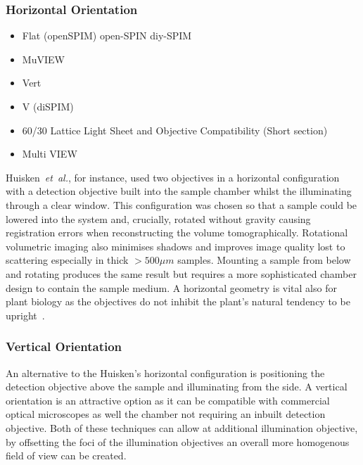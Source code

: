 \subsubsection{Horizontal Orientation}

\begin{itemize}
	\item[\checked]  Flat (openSPIM) open-SPIN diy-SPIM
				\item[\checked] MuVIEW\cite{swoger_multi-view_2007}%
	\item[\checked] Vert
	\item[\checked] V (diSPIM)
	\item[\checked] 60/30		Lattice Light Sheet and Objective Compatibility (Short section)
	\item[] Multi VIEW
\end{itemize}

Huisken~\emph{et~al.}, for instance, used two objectives in a horizontal configuration with a detection objective built into the sample chamber whilst the illuminating through a clear window.
This configuration was chosen so that a sample could be lowered into the system and, crucially, rotated without gravity causing registration errors when reconstructing the volume tomographically.
Rotational volumetric imaging also minimises shadows and improves image quality lost to scattering especially in thick \(>500 \mu m\) samples.
Mounting a sample from below and rotating produces the same result but requires a more sophisticated chamber design to contain the sample medium.
A horizontal geometry is vital also for plant biology as the objectives do not inhibit the plant's natural tendency to be upright~\cite{wangenheim_rules_2016}. %

\subsubsection{Vertical Orientation}

An alternative to the Huisken's horizontal configuration is positioning the detection objective above the sample and illuminating from the side.
A vertical orientation is an attractive option as it can be compatible with commercial optical microscopes as well the chamber not requiring an inbuilt detection objective. %
Both of these techniques can allow at  additional illumination objective, by offsetting the foci of the illumination objectives an overall more homogenous field of view can be created.


